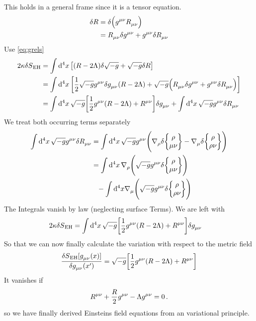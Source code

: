 This holds in a general frame since it is a tensor equation.
\begin{equation}
\begin{split}
\delta R &=\delta \left(\tensor{g}{^\mu^\nu}\tensor{R}{_\mu_\nu}\right)\\
&=\tensor{R}{_\mu_\nu}\delta\tensor{g}{^\mu^\nu}
+\tensor{g}{^\mu^\nu}\delta\tensor{R}{_\mu_\nu}\\
\end{split}
\end{equation}
Use \eqref{eq:grels}
\begin{equation}
\begin{split}
2\kappa\delta S\textsubscript{EH}
&=\fourint \left[
(R-2\Lambda)\delta\sqrt{-g}+\sqrt{-g}\delta R\right]\\
&=\fourint \left[
\frac{1}{2}\sqrt{-g}\tensor{g}{^\mu^\nu}\delta\tensor{g}{_\mu_\nu}
(R-2\Lambda)+\sqrt{-g}\left(\tensor{R}{_\mu_\nu}\delta\tensor{g}{^\mu^\nu}
+\tensor{g}{^\mu^\nu}\delta\tensor{R}{_\mu_\nu}\right)\right]\\
&=\fourint \sqrt{-g}\left[
\frac{1}{2}\tensor{g}{^\mu^\nu}
(R-2\Lambda)+\tensor{R}{^\mu^\nu}\right]\delta\tensor{g}{_\mu_\nu}
+\fourint \sqrt{-g}\tensor{g}{^\mu^\nu}\delta\tensor{R}{_\mu_\nu}
\\
\end{split}
\end{equation}
We treat both occurring terms separately
\begin{equation}
\begin{split}
\fourint \sqrt{-g}\tensor{g}{^\mu^\nu}\delta\tensor{R}{_\mu_\nu}
&=\fourint \sqrt{-g}\tensor{g}{^\mu^\nu}\left(\tensor{\nabla}{_\rho}\delta
\cSym{\rho}{\mu}{\nu} -\tensor{\nabla}{_\mu}\delta \cSym{\rho}{\rho}{\nu}\right)
\\
&=\fourint \tensor{\nabla}{_\rho}\left(\sqrt{-g}\tensor{g}{^\mu^\nu}\delta
\cSym{\rho}{\mu}{\nu}\right)\\
&\phantom{=}-\int\dif{}^4 x \tensor{\nabla}{_\mu}\left(\sqrt{-g}\tensor{g}{^\mu^\nu}\delta
\cSym{\rho}{\rho}{\nu}\right)
\end{split}
\end{equation}
The Integrals vanish by  law (neglecting surface Terms). We are left
with
\begin{equation}
\begin{split}
2\kappa\delta S\textsubscript{EH}
&=\fourint \sqrt{-g}\left[
\frac{1}{2}\tensor{g}{^\mu^\nu}
(R-2\Lambda)+\tensor{R}{^\mu^\nu}\right]\delta\tensor{g}{_\mu_\nu}
\end{split}
\end{equation}
So that we can now finally calculate the variation with respect to the metric
field
\begin{equation}
\frac{\delta
S\textsubscript{EH}[\tensor{g}{_\mu_\nu}(x)]}{\delta\tensor{g}{_\mu_\nu}(x')}
=\sqrt{-g}\left[\frac{1}{2}\tensor{g}{^\mu^\nu}
(R-2\Lambda)+\tensor{R}{^\mu^\nu}\right]
\end{equation}
It vanishes if 
\begin{equation}
\tensor{R}{^\mu^\nu}+\frac{R}{2}\tensor{g}{^\mu^\nu}
-\Lambda\tensor{g}{^\mu^\nu}=0\, .
\end{equation}
so we have finally derived Einsteins field equations from an variational
principle.
